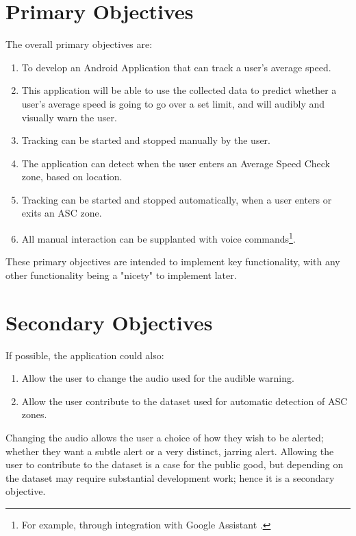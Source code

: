 \documentclass[11pt, a4paper, notitlepage]{report}
\newcounter{objectivesCounter}
\begin{document}
\section{Primary Objectives}\label{sec:PrimObj}
The overall primary objectives are:
\begin{enumerate}
	\item To develop an Android Application that can track a user's average speed.
	\item This application will be able to use the collected data to predict whether a user's average speed is going to go over a set limit, and will audibly and visually warn the user.
	\item Tracking can be started and stopped manually by the user.
	\item The application can detect when the user enters an Average Speed Check zone, based on location.
	\item Tracking can be started and stopped automatically, when a user enters or exits an ASC zone.
	\item All manual interaction can be supplanted with voice commands\footnote{For example, through integration with Google Assistant \citep{GoogleAssistant}.}.
	\setcounter{objectivesCounter}{\value{enumi}}
\end{enumerate}
These primary objectives are intended to implement key functionality, with any other functionality being a "nicety" to implement later.

\section{Secondary Objectives}\label{sec:SecObj}
If possible, the application could also:
\begin{enumerate}
	\setcounter{enumi}{\value{objectivesCounter}}
	\item Allow the user to change the audio used for the audible warning.
	\item Allow the user contribute to the dataset used for automatic detection of ASC zones.
	\setcounter{objectivesCounter}{\value{enumi}}
\end{enumerate}
Changing the audio allows the user a choice of how they wish to be alerted; whether they want a subtle alert or a very distinct, jarring alert. Allowing the user to contribute to the dataset is a case for the public good, but depending on the dataset may require substantial development work; hence it is a secondary objective.
\end{document}
